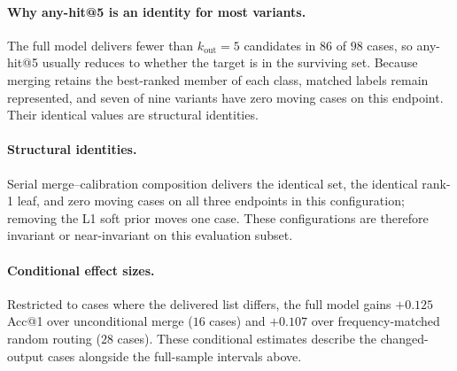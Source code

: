 \documentclass[letterpaper]{article}
\begin{document}
\paragraph{Why any-hit@5 is an identity for most variants.}
The full model delivers fewer than $k_{\mathrm{out}}{=}5$ candidates in $86$ of $98$ cases, so any-hit@5 usually reduces to whether the target is in the surviving set.
Because merging retains the best-ranked member of each class, matched labels remain represented, and seven of nine variants have zero moving cases on this endpoint.
Their identical values are structural identities.

\paragraph{Structural identities.}
Serial merge--calibration composition delivers the identical set, the identical rank-1 leaf, and zero moving cases on all three endpoints in this configuration; removing the L1 soft prior moves one case.
These configurations are therefore invariant or near-invariant on this evaluation subset.

\paragraph{Conditional effect sizes.}
Restricted to cases where the delivered list differs, the full model gains $+0.125$ Acc@1 over unconditional merge ($16$ cases) and $+0.107$ over frequency-matched random routing ($28$ cases).
These conditional estimates describe the changed-output cases alongside the full-sample intervals above.
\end{document}
